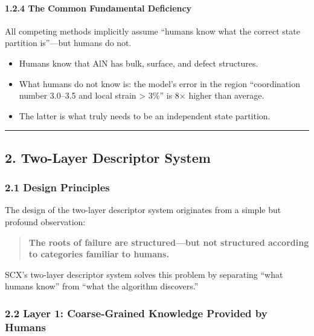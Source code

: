 \documentclass[
  12pt,
]{article}
\providecommand{\tightlist}{%
  \setlength{\itemsep}{0pt}\setlength{\parskip}{0pt}}
\begin{document}
\paragraph{1.2.4 The Common Fundamental Deficiency}\label{the-common-fundamental-deficiency}

All competing methods implicitly assume ``humans know what the correct state partition is''---but humans do not.

\begin{itemize}
\tightlist
\item
  Humans know that AlN has bulk, surface, and defect structures.
\item
  What humans do not know is: the model's error in the region ``coordination number 3.0--3.5 and local strain > 3\%'' is 8$\times$ higher than average.
\item
  The latter is what truly needs to be an independent state partition.
\end{itemize}

\begin{center}\rule{0.5\linewidth}{0.5pt}\end{center}

\subsection{2. Two-Layer Descriptor System}\label{two-layer-descriptor-system}

\subsubsection{2.1 Design Principles}\label{design-principles}

The design of the two-layer descriptor system originates from a simple but profound observation:

\begin{quote}
\textbf{The roots of failure are structured---but not structured according to categories familiar to humans.}
\end{quote}

SCX's two-layer descriptor system solves this problem by separating ``what humans know'' from ``what the algorithm discovers.''

\subsubsection{2.2 Layer 1: Coarse-Grained Knowledge Provided by Humans}\label{layer-1-human-knowledge}
\end{document}
